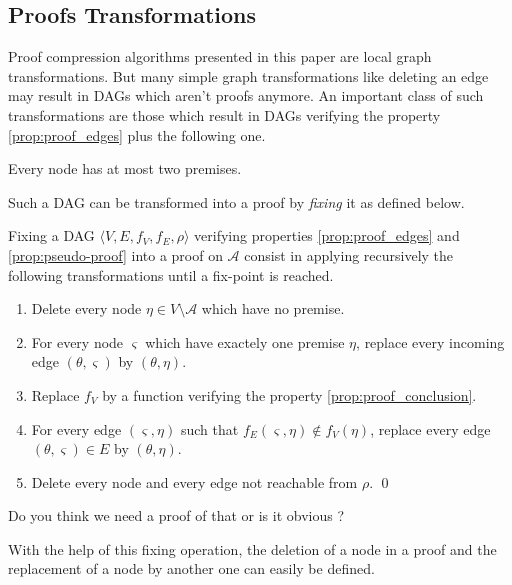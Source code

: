 \documentclass{llncs}
\newenvironment{jogo}{\color{teal}}{}
\begin{document}
\subsection{Proofs Transformations}

Proof compression algorithms presented in this paper are local graph transformations.  But many
simple graph transformations like deleting an edge may result in DAGs which aren't proofs anymore.
An important class of such transformations are those which result in DAGs verifying the property
\ref{prop:proof_edges} plus the following one.

\begin{property}
\label{prop:pseudo-proof}
Every node has at most two premises.
\end{property}

Such a DAG can be transformed into a proof by \emph{fixing} it as defined below.

\begin{definition}[Fixing]
Fixing a DAG $\langle V, E, f_V, f_E, \rho \rangle$ verifying properties \ref{prop:proof_edges} and
\ref{prop:pseudo-proof} into a proof on $\mathcal{A}$ consist in applying recursively the following
transformations until a fix-point is reached.
\begin{enumerate}
  \item Delete every node $\eta \in V \setminus \mathcal{A}$ which have no premise.
  \item For every node $\varsigma$ which have exactely one premise $\eta$, replace every incoming
    edge $(\theta,\varsigma)$ by $(\theta,\eta)$.
  \item Replace $f_V$ by a function verifying the property \ref{prop:proof_conclusion}.
  \item For every edge $(\varsigma,\eta)$ such that $f_E(\varsigma,\eta) \notin f_V(\eta)$, replace
    every edge $(\theta,\varsigma) \in E$ by $(\theta,\eta)$.
  \item Delete every node and every edge not reachable from $\rho$.
  \qed
\end{enumerate}
\end{definition}

\begin{jogo}
Do you think we need a proof of that or is it obvious ?
\end{jogo}

With the help of this fixing operation, the deletion of a node in a proof and the replacement of a
node by another one can easily be defined.
\end{document}
